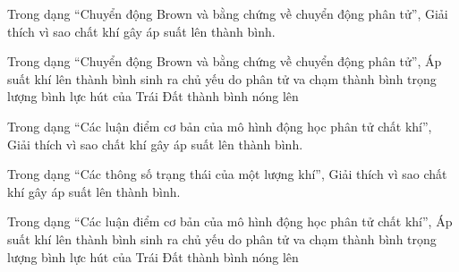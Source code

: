 \begin{ex}
Trong dạng “Chuyển động Brown và bằng chứng về chuyển động phân tử”, Giải thích vì sao chất khí gây áp suất lên thành bình.
\choiceTF

\end{ex}

\begin{ex}
Trong dạng “Chuyển động Brown và bằng chứng về chuyển động phân tử”, Áp suất khí lên thành bình sinh ra chủ yếu do
\choice
{\True phân tử va chạm thành bình}
{trọng lượng bình}
{lực hút của Trái Đất}
{thành bình nóng lên}
\end{ex}

\begin{ex}
Trong dạng “Các luận điểm cơ bản của mô hình động học phân tử chất khí”, Giải thích vì sao chất khí gây áp suất lên thành bình.
\choiceTF

\end{ex}

\begin{ex}
Trong dạng “Các thông số trạng thái của một lượng khí”, Giải thích vì sao chất khí gây áp suất lên thành bình.
\choiceTF

\end{ex}

\begin{ex}
Trong dạng “Các luận điểm cơ bản của mô hình động học phân tử chất khí”, Áp suất khí lên thành bình sinh ra chủ yếu do
\choice
{\True phân tử va chạm thành bình}
{trọng lượng bình}
{lực hút của Trái Đất}
{thành bình nóng lên}
\end{ex}

